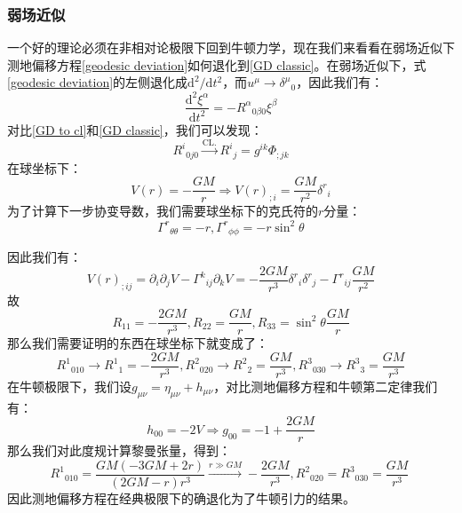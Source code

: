 \documentclass[hyperref, UTF8, a4paper]{ctexart}
\begin{document}
\subsubsection{弱场近似}
一个好的理论必须在非相对论极限下回到牛顿力学，现在我们来看看在弱场近似下测地偏移方程\eqref{geodesic deviation}如何退化到\eqref{GD classic}。在弱场近似下，式\eqref{geodesic deviation}的左侧退化成$\mathrm{d}^{2} /\mathrm{d} t^{2}$，而$u^{\mu }\rightarrow \delta ^{\mu }{}_{0}$，因此我们有：
\begin{equation}
	\frac{\mathrm{d}^{2} \xi ^{\alpha }}{\mathrm{d} t^{2}} =-R^{\alpha }{}_{0\beta 0} \xi ^{\beta }
	\label{GD to cl}
\end{equation}
对比\eqref{GD to cl}和\eqref{GD classic}，我们可以发现：
\begin{equation*}
	R^{i}{}_{0j0}\xrightarrow{\text{CL.}} R^{i}{}_{j} =g^{ik} \Phi _{;jk}
\end{equation*}
在球坐标下：
\begin{equation*}
	V( r) =-\frac{GM}{r} \Rightarrow V( r)_{;i} =\frac{GM}{r^{2}} \delta ^{r}{}_{i}
\end{equation*}
为了计算下一步协变导数，我们需要球坐标下的克氏符的$r$分量：\begin{equation*}
	\Gamma ^{r}{}_{\theta \theta } =-r,\Gamma ^{r}{}_{\phi \phi } =-r\sin^{2} \theta 
\end{equation*}

因此我们有：
\begin{equation*}
	V( r)_{;ij} =\partial _{i} \partial _{j} V-\Gamma ^{k}{}_{ij} \partial _{k} V=-\frac{2GM}{r^{3}} \delta ^{r}{}_{i} \delta ^{r}{}_{j} -\Gamma ^{r}{}_{ij}\frac{GM}{r^{2}}
\end{equation*}
故
\begin{equation*}
	R_{11} =-\frac{2GM}{r^{3}} ,R_{22} =\frac{GM}{r} ,R_{33} =\sin^{2} \theta \frac{GM}{r}
\end{equation*}
那么我们需要证明的东西在球坐标下就变成了：
\begin{equation*}
	R^{1}{}_{010}\rightarrow R^{1}{}_{1} =-\frac{2GM}{r^{3}} ,R^{2}{}_{020}\rightarrow R^{2}{}_{2} =\frac{GM}{r^{3}} ,R^{3}{}_{030}\rightarrow R^{3}{}_{3} =\frac{GM}{r^{3}}
\end{equation*}
在牛顿极限下，我们设$g_{\mu \nu } =\eta _{\mu \nu } +h_{\mu \nu }$，对比测地偏移方程和牛顿第二定律我们有：
\begin{equation*}
	h_{00} =-2V\Rightarrow g_{00} =-1+\frac{2GM}{r}
\end{equation*}
那么我们对此度规计算黎曼张量，得到：
\begin{equation*}
	R^{1}{}_{010} =\frac{GM( -3GM+2r)}{( 2GM-r) r^{3}}\xrightarrow{r\gg GM} -\frac{2GM}{r^{3}} ,R^{2}{}_{020} =R^{3}{}_{030} =\frac{GM}{r^{3}} \ 
\end{equation*}
因此测地偏移方程在经典极限下的确退化为了牛顿引力的结果。
\end{document}
